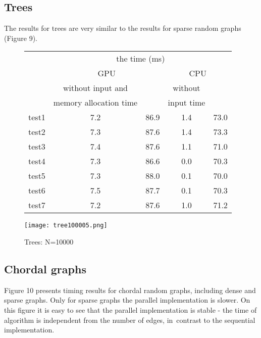 \documentclass[a4paper, 11pt]{article}
\begin{document}
\subsection{Trees}

The results for trees are very similar to the results for sparse random graphs (Figure 9).

\begin{figure}[h!]
    \caption{Trees: N=10000}
    \begin{center}
    \begin{tabular}{|r|c|c|c|c|}
        \hline
        & \multicolumn{4}{|c|}{the time (ms)}\\
        \cline{2-5}
        & \multicolumn{2}{|c|}{GPU} & \multicolumn{2}{|c|}{CPU}\\
        \cline{2-5}
            & without input and &  & without & \\
           & memory allocation time&  & input time & \\
        \hline
        test1 & 7.2 & 86.9 & 1.4 & 73.0\\
        test2 & 7.3 & 87.6 & 1.4 & 73.3\\
        test3 & 7.4 & 87.6 & 1.1 & 71.0\\
        test4 & 7.3 & 86.6 & 0.0 & 70.3\\
        test5 & 7.3 & 88.0 & 0.1 & 70.0\\
        test6 & 7.5 & 87.7 & 0.1 & 70.3\\
        test7 & 7.2 & 87.6 & 1.0 & 71.2\\
        \hline
    \end{tabular}
\texttt{[image: tree100005.png]}\\
    \end{center}
\end{figure}
\newpage

\subsection{Chordal graphs}

Figure 10 presents timing results for chordal random graphs, including dense and sparse 
graphs. Only for sparse graphs the parallel implementation is slower. On this figure it is easy to see
that the parallel implementation is stable - the time of algorithm is independent from the number of 
edges, in~contrast to the sequential implementation.
\end{document}
